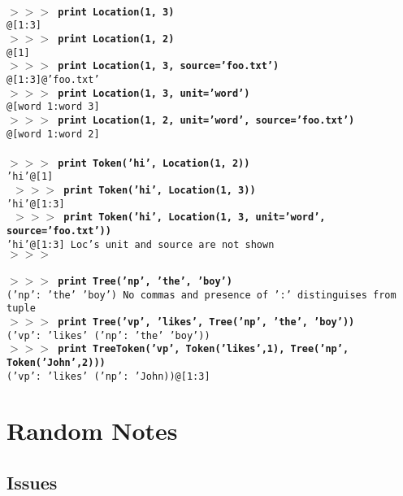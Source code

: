 \documentclass[11pt]{article}
\begin{document}
\newpage
\begin{tabbing}
\tt
\hspace{3in}\=\\
\textbf{$>>>$ print Location(1, 3)}\\
@[1:3]\\
\textbf{$>>>$ print Location(1, 2)}\\
@[1]\\
\textbf{$>>>$ print Location(1, 3, source='foo.txt')}\\
@[1:3]@'foo.txt'\\
\textbf{$>>>$ print Location(1, 3, unit='word')}\\
@[word 1:word 3]\\
\textbf{$>>>$ print Location(1, 2, unit='word', source='foo.txt')}\\
@[word 1:word 2]\\
\\
\textbf{$>>>$ print Token('hi', Location(1, 2))}\\
'hi'@[1]\\\
\textbf{$>>>$ print Token('hi', Location(1, 3))}\\
'hi'@[1:3]\\\
\textbf{$>>>$ print Token('hi', Location(1, 3, unit='word', source='foo.txt'))}\\
'hi'@[1:3] \>\textrm{Loc's unit and source are not shown}\\
\textbf{$>>>$ }\\
\\
\textbf{$>>>$ print Tree('np', 'the', 'boy')}\\
('np': 'the' 'boy') \>\textrm{No commas and presence of ':' distinguises from tuple}\\
\textbf{$>>>$ print Tree('vp', 'likes', Tree('np', 'the', 'boy'))}\\
('vp': 'likes' ('np': 'the' 'boy'))\\
\textbf{$>>>$ print TreeToken('vp', Token('likes',1), Tree('np', Token('John',2)))}\\
('vp': 'likes' ('np': 'John))@[1:3]\\


\end{tabbing}


\section{Random Notes}

\subsection{Issues}
\end{document}
